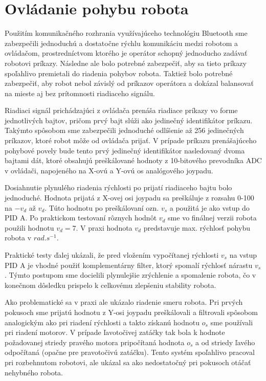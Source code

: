 \section{Ovládanie pohybu robota}
Použitím komunikačného rozhrania využívajúceho technológiu Bluetooth sme zabezpečili jednoduchú a dostatočne rýchlu komunikáciu medzi robotom a ovládačom, prostredníctvom ktorého je operátor schopný jednoducho zadávať robotovi príkazy. Následne ale bolo potrebné zabezpečiť, aby sa tieto príkazy spoľahlivo premietali do riadenia pohybov robota. Taktiež bolo potrebné zabezpečiť, aby robot nebol závislý od príkazov operátora a dokázal balansovať na mieste aj bez prítomnosti riadiaceho signálu.

Riadiaci signál prichádzajúci z ovládača prenáša riadiace príkazy vo forme jednotlivých bajtov, pričom prvý bajt slúži ako jedinečný identifikátor príkazu. Takýmto spôsobom sme zabezpečili jednoduché odlíšenie až 256 jedinečných príkazov, ktoré robot môže od ovládača prijať. V prípade príkazu prenášajúceho pohybové povely bude tento prvý jedinečný identifikátor nasledovaný dvoma bajtami dát, ktoré obsahujú preškálované hodnoty z 10-bitového prevodníka ADC v ovládači, napojeného na X-ovú a Y-ovú os analógového joypadu.  

Dosiahnutie plynulého riadenia rýchlosti po prijatí riadiaceho bajtu bolo jednoduché. Hodnota prijatá z X-ovej osi joypadu sa preškáluje z rozsahu 0-100 na $-v_d$ až $v_d$. Túto hodnotu po preškálovaní ozn. $v_s$ a použitá je ako vstup do PID A. Po praktickom testovaní rôznych hodnôt $v_d$ sme vo finálnej verzii robota použili hodnotu $v_d = 7$. V praxi hodnota $v_d$ predstavuje max. rýchlosť pohybu robota v $rad.s^{-1}$.

Praktické testy ďalej ukázali, že pred vložením vypočítanej rýchlosti $v_s$ na vstup PID A je vhodné použiť komplementárny filter, ktorý spomalí rýchlosť nárastu $v_s$. Týmto postupom sme docielili plynulejšie zrýchlenie a spomalenie robota, čo v konečnom dôsledku prispelo k celkovému zlepšeniu stability robota.

Ako problematické sa v praxi ale ukázalo riadenie smeru robota. Pri prvých pokusoch sme prijatú hodnotu z Y-osi joypadu preškálovali a filtrovali spôsobom analogickým ako pri riadení rýchlosti a takto získanú hodnotu $o_s$ sme používali pri riadení motorov. V prípade ľavotočivej zatáčky tak bola k hodnote požadovanej striedy pravého motora pripočítaná hodnota $o_s$ a od striedy ľavého odpočítaná (opačne pre pravotočivú zatáčku). Tento systém spoľahlivo pracoval pri rozbehnutom robotovi, ale ukázal sa ako nedostatočný pri pokusoch otáčať nehybného robota.

